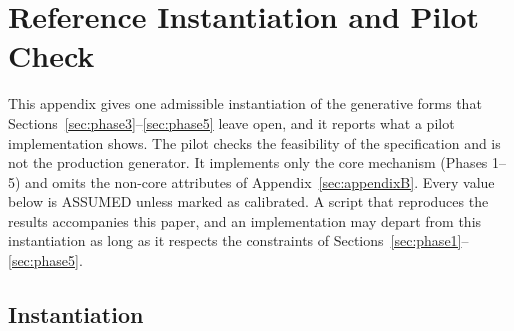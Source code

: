 \documentclass[11pt]{article}
\begin{document}
\appendix
\FloatBarrier
\section{Reference Instantiation and Pilot Check}
\label{sec:appendixA}

\hspace*{\parindent}This appendix gives one admissible instantiation of the generative forms that Sections~\ref{sec:phase3}--\ref{sec:phase5} leave open, and it reports what a pilot implementation shows. The pilot checks the feasibility of the specification and is not the production generator. It implements only the core mechanism (Phases 1--5) and omits the non-core attributes of Appendix~\ref{sec:appendixB}. Every value below is ASSUMED unless marked as calibrated. A script that reproduces the results accompanies this paper, and an implementation may depart from this instantiation as long as it respects the constraints of Sections~\ref{sec:phase1}--\ref{sec:phase5}.

\subsection{Instantiation}
\end{document}
